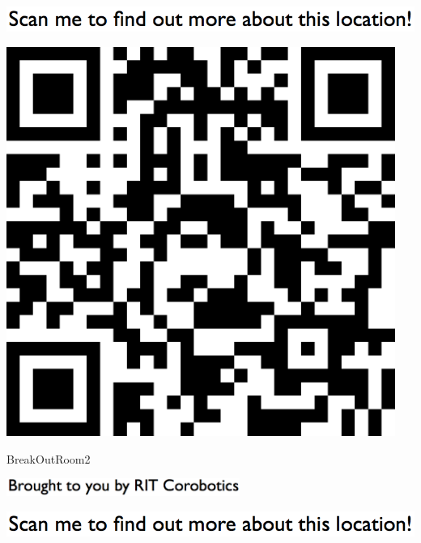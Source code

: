 \documentclass[letterpaper]{article}
\begin{document}
 
 \vspace*{\fill} 
 
  \centerline{\includegraphics[scale=1,width=6in]{text-top.png}} 
 
 \vspace{0.5in} 
 
 \begingroup 
 \centerline{\includegraphics[scale=1,width=5in,height=5in]{BreakOutRoom2.png}} 
 \endgroup 
 \vspace*{\fill} 

 \hfill{\small BreakOutRoom2} 

  \vspace{0.7in} 
 
 \centerline{\includegraphics[scale=1,width=3in]{text-bottom.png}} 
 
 \pagebreak 
{} 
 \vspace*{\fill} 
 
  \centerline{\includegraphics[scale=1,width=6in]{text-top.png}} 
 
\end{document}

